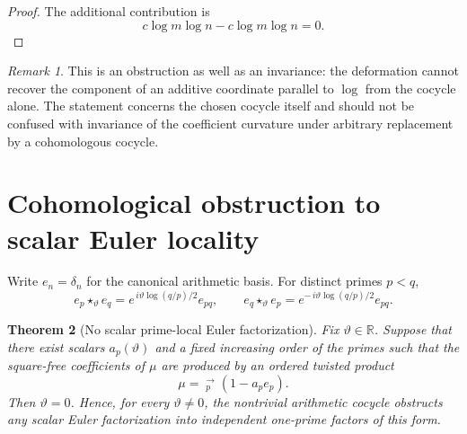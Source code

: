 \documentclass[11pt]{amsart}
\numberwithin{equation}{section}
\theoremstyle{plain}
\newtheorem{theorem}{Theorem}[section]
\theoremstyle{definition}
\theoremstyle{remark}
\newtheorem{remark}[theorem]{Remark}
\begin{document}
\begin{proof}
The additional contribution is
\begin{equation}
c\log m\log n-c\log m\log n=0.
\label{eq:gauge_added_term_zero}
\end{equation}
\end{proof}

\begin{remark}
\label{rem:gauge_obstruction}
This is an obstruction as well as an invariance: the deformation cannot
recover the component of an additive coordinate parallel to \(\log\) from
the cocycle alone.  The statement concerns the chosen cocycle itself and
should not be confused with invariance of the coefficient curvature under
arbitrary replacement by a cohomologous cocycle.
\end{remark}

\section{Cohomological obstruction to scalar Euler locality}
\label{sec:euler_locality_obstruction}

Write \(e_n=\delta_n\) for the canonical arithmetic basis.  For distinct
primes \(p<q\),
\begin{equation}
e_p\star_\vartheta e_q
=
e^{\,i\vartheta\log(q/p)/2}e_{pq},
\qquad
e_q\star_\vartheta e_p
=
e^{-\,i\vartheta\log(q/p)/2}e_{pq}.
\label{eq:prime_basis_twist}
\end{equation}

\begin{theorem}[No scalar prime-local Euler factorization]
\label{thm:no_scalar_euler_product}
Fix \(\vartheta\in\mathbb R\).  Suppose that there exist scalars
\(a_p(\vartheta)\) and a fixed increasing order of the primes such that the
square-free coefficients of \(\mu\) are produced by an ordered twisted
product
\begin{equation}
\mu=
\mathop{\star_\vartheta}_{p}^{\longrightarrow}
(1-a_p e_p).
\label{eq:putative_scalar_euler_mu}
\end{equation}
Then \(\vartheta=0\).  Hence, for every \(\vartheta\ne0\), the nontrivial
arithmetic cocycle obstructs any scalar Euler factorization into independent
one-prime factors of this form.
\end{theorem}
\end{document}
